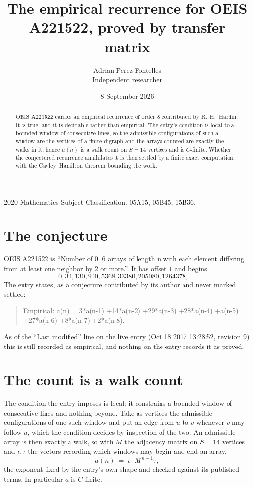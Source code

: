\documentclass[11pt,a4paper]{article}
\title{The empirical recurrence for OEIS A221522, proved by transfer matrix}
\author{Adrian Perez Fontelles\\ \small Independent researcher}
\date{8 September 2026}
\theoremstyle{plain}
\theoremstyle{definition}
\begin{document}
\maketitle

\begin{abstract}
OEIS A221522 carries an empirical recurrence of order $8$ contributed by R.~H.~Hardin. It is
true, and it is decidable rather than empirical. The entry's condition is local to a bounded window of consecutive lines, so
the admissible configurations of such a window are the vertices of a finite digraph and the
arrays counted are exactly the walks in it; hence $a(n)$ is a walk count on $S=14$ vertices
and is $C$-finite. Whether the conjectured recurrence annihilates it is then settled by a
finite exact computation, with the Cayley--Hamilton theorem bounding the work.
\end{abstract}

\noindent\small 2020 Mathematics Subject Classification. 05A15, 05B45, 15B36.\normalsize

\section{The conjecture}

OEIS A221522 is ``Number of 0..6 arrays of length n with each element differing from at least one neighbor by 2 or more.''. It has offset $1$ and begins
\[
0, 30, 130, 900, 5368, 33380, 205080, 1264378,\ \dots
\]
The entry states, as a conjecture contributed by its author and never marked settled:
\begin{quote}
Empirical: a(n) = 3*a(n-1) +14*a(n-2) +29*a(n-3) +28*a(n-4) +a(n-5) +27*a(n-6) +8*a(n-7) +2*a(n-8).
\end{quote}
As of the ``Last modified'' line on the live entry (Oct 18 2017 13:28:52, revision 9) this is still
recorded as empirical, and nothing on the entry records it as proved.

\section{The count is a walk count}

The condition the entry imposes is local: it constrains a bounded window of consecutive lines and nothing beyond. Take as
vertices the admissible configurations of one such window and put an edge from $u$ to $v$
whenever $v$ may follow $u$, which the condition decides by inspection of the two. An
admissible array is then exactly a walk, so with $M$ the adjacency matrix on $S=14$ vertices
and $\iota,\tau$ the vectors recording which windows may begin and end an array,
\[
a(n)\;=\;\iota^{\!\top}M^{\,n-1}\tau ,
\]
the exponent fixed by the entry's own shape and checked against its published terms. In
particular $a$ is $C$-finite.
\end{document}
